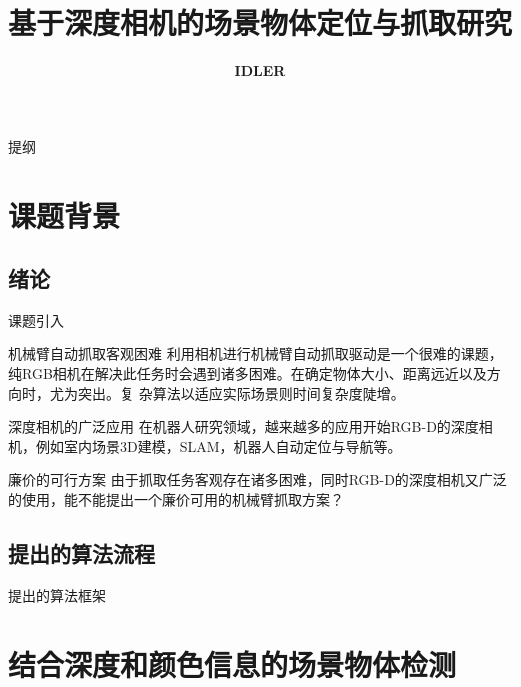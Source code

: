 \documentclass[xcolor=table,compress,blue]{beamer}
\title{\textbf{\Huge{基于深度相机的场景物体定位与抓取研究}}}
\institute{ 
	\textbf{\large{Social University}}
}
\author{\textbf{\huge{IDLER}}}
\date{\tiny{}}
\begin{document}
\frame{
	\titlepage
	\thispagestyle{empty}
}
\begin{frame}[plain]{提纲}
	\vspace{-16pt}
	\textbf{\Large{\tableofcontents[hideallsubsections]}}
\end{frame}


%

\section{课题背景}
  \subsection{绪论}
	\begin{frame}{课题引入}
		\begin{exampleblock}{机械臂自动抓取客观困难}
			利用相机进行机械臂自动抓取驱动是一个很难的课题，纯RGB相机在解决此任务时会遇到诸多困难。在确定物体大小、距离远近以及方向时，尤为突出。复
			杂算法以适应实际场景则时间复杂度陡增。
		\end{exampleblock}
		\begin{exampleblock}{深度相机的广泛应用}
			在机器人研究领域，越来越多的应用开始RGB-D的深度相机，例如室内场景3D建模，SLAM，机器人自动定位与导航等。
		\end{exampleblock}
		\begin{exampleblock}{廉价的可行方案}
			由于抓取任务客观存在诸多困难，同时RGB-D的深度相机又广泛的使用，能不能提出一个廉价可用的机械臂抓取方案？
		\end{exampleblock}
	\end{frame}
	\subsection{提出的算法流程}
		\begin{frame}{提出的算法框架}
		\end{frame}	
  
\section{结合深度和颜色信息的场景物体检测}
\end{document}
